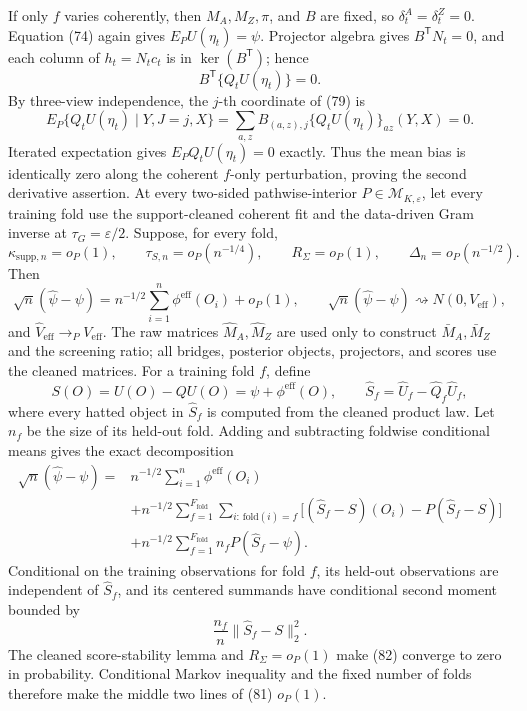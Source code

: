 If only \(f\) varies coherently, then \(M_A,M_Z,\pi\), and \(B\) are fixed, so \(\delta_t^A=\delta_t^Z=0\).  Equation (74) again gives \(E_PU(\eta_t)=\psi\).  Projector algebra gives \(B^{\mathsf T}N_t=0\), and each column of \(h_t=N_tc_t\) is in \(\ker(B^{\mathsf T})\); hence
\[
 B^{\mathsf T}\{Q_tU(\eta_t)\}=0.                             \tag{79}
\]
By three-view independence, the \(j\)-th coordinate of (79) is
\[
 E_P\{Q_tU(\eta_t)\mid Y,J=j,X\}
 =\sum_{a,z}B_{(a,z),j}\{Q_tU(\eta_t)\}_{az}(Y,X)=0.
\]
Iterated expectation gives \(E_PQ_tU(\eta_t)=0\) exactly.  Thus the mean bias is identically zero along the coherent \(f\)-only perturbation, proving the second derivative assertion.
At every two-sided pathwise-interior \(P\in\mathcal M_{K,\varepsilon}\), let every training fold use the support-cleaned coherent fit and the data-driven Gram inverse at \(\tau_G=\varepsilon/2\).  Suppose, for every fold,
\[
 \kappa_{\mathrm{supp},n}=o_P(1),
 \qquad \tau_{S,n}=o_P(n^{-1/4}),
 \qquad R_\Sigma=o_P(1),
 \qquad \Delta_n=o_P(n^{-1/2}).
\]
Then
\[
 \sqrt n(\widehat\psi-\psi)
 =n^{-1/2}\sum_{i=1}^n\phi^{\mathrm{eff}}(O_i)+o_P(1),
 \qquad
 \sqrt n(\widehat\psi-\psi)\rightsquigarrow N(0,V_{\mathrm{eff}}),
\]
and \(\widehat V_{\mathrm{eff}}\to_PV_{\mathrm{eff}}\).  The raw matrices \(\widehat M_A,\widehat M_Z\) are used only to construct \(\bar M_A,\bar M_Z\) and the screening ratio; all bridges, posterior objects, projectors, and scores use the cleaned matrices.
For a training fold \(f\), define
\[
 S(O)=U(O)-QU(O)=\psi+\phi^{\mathrm{eff}}(O),
 \qquad
 \widehat S_f=\widehat U_f-\widehat Q_f\widehat U_f,             \tag{80}
\]
where every hatted object in \(\widehat S_f\) is computed from the cleaned product law.  Let \(n_f\) be the size of its held-out fold.  Adding and subtracting foldwise conditional means gives the exact decomposition
\[
\begin{aligned}
 \sqrt n(\widehat\psi-\psi)
={}&n^{-1/2}\sum_{i=1}^n\phi^{\mathrm{eff}}(O_i)\\
&+n^{-1/2}\sum_{f=1}^{F_{\mathrm{fold}}}
 \sum_{i:\,\mathrm{fold}(i)=f}
 \bigl[(\widehat S_f-S)(O_i)-P(\widehat S_f-S)\bigr]\\
&+n^{-1/2}\sum_{f=1}^{F_{\mathrm{fold}}}n_fP(\widehat S_f-\psi). \tag{81}
\end{aligned}
\]
Conditional on the training observations for fold \(f\), its held-out observations are independent of \(\widehat S_f\), and its centered summands have conditional second moment bounded by
\[
 \frac{n_f}{n}\|\widehat S_f-S\|_2^2.                          \tag{82}
\]
The cleaned score-stability lemma and \(R_\Sigma=o_P(1)\) make (82) converge to zero in probability.  Conditional Markov inequality and the fixed number of folds therefore make the middle two lines of (81) \(o_P(1)\).

